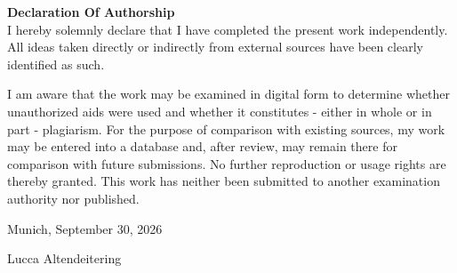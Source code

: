 \cleardoublepage
{}
\thispagestyle{empty}
\textbf{Declaration Of Authorship}\\

I hereby solemnly declare that I have completed the present work independently. All ideas taken directly or indirectly from external sources have been clearly identified as such.

I am aware that the work may be examined in digital form to determine whether unauthorized aids were used and whether it constitutes - either in whole or in part - plagiarism. For the purpose of comparison with existing sources, my work may be entered into a database and, after review, may remain there for comparison with future submissions. No further reproduction or usage rights are thereby granted. This work has neither been submitted to another examination authority nor published.


\vspace{2cm}
Munich, September 30, 2026
\vspace{2cm}

Lucca Altendeitering